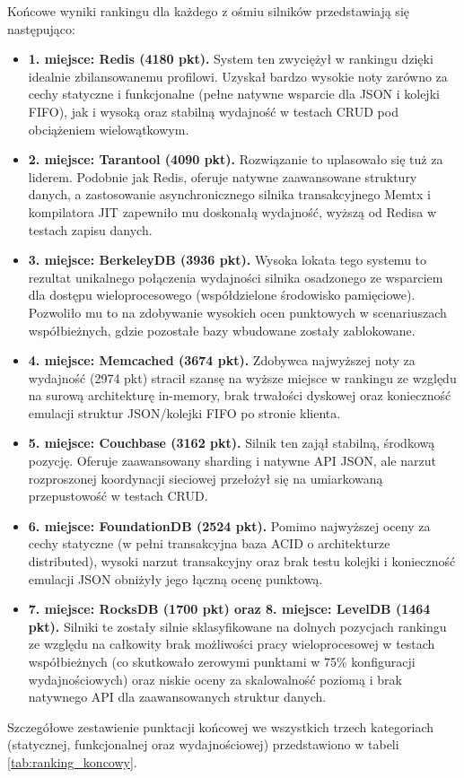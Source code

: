 Końcowe wyniki rankingu dla każdego z ośmiu silników przedstawiają się następująco:
\begin{itemize}
    \item \textbf{1. miejsce: Redis (4180 pkt).} System ten zwyciężył w rankingu dzięki idealnie zbilansowanemu profilowi. Uzyskał bardzo wysokie noty zarówno za cechy statyczne i funkcjonalne (pełne natywne wsparcie dla JSON i kolejki FIFO), jak i wysoką oraz stabilną wydajność w testach CRUD pod obciążeniem wielowątkowym.
    \item \textbf{2. miejsce: Tarantool (4090 pkt).} Rozwiązanie to uplasowało się tuż za liderem. Podobnie jak Redis, oferuje natywne zaawansowane struktury danych, a zastosowanie asynchronicznego silnika transakcyjnego Memtx i kompilatora JIT zapewniło mu doskonałą wydajność, wyższą od Redisa w testach zapisu danych.
    \item \textbf{3. miejsce: BerkeleyDB (3936 pkt).} Wysoka lokata tego systemu to rezultat unikalnego połączenia wydajności silnika osadzonego ze wsparciem dla dostępu wieloprocesowego (współdzielone środowisko pamięciowe). Pozwoliło mu to na zdobywanie wysokich ocen punktowych w scenariuszach współbieżnych, gdzie pozostałe bazy wbudowane zostały zablokowane.
    \item \textbf{4. miejsce: Memcached (3674 pkt).} Zdobywca najwyższej noty za wydajność (2974 pkt) stracił szansę na wyższe miejsce w rankingu ze względu na surową architekturę in-memory, brak trwałości dyskowej oraz konieczność emulacji struktur JSON/kolejki FIFO po stronie klienta.
    \item \textbf{5. miejsce: Couchbase (3162 pkt).} Silnik ten zajął stabilną, środkową pozycję. Oferuje zaawansowany sharding i natywne API JSON, ale narzut rozproszonej koordynacji sieciowej przełożył się na umiarkowaną przepustowość w testach CRUD.
    \item \textbf{6. miejsce: FoundationDB (2524 pkt).} Pomimo najwyższej oceny za cechy statyczne (w pełni transakcyjna baza ACID o architekturze distributed), wysoki narzut transakcyjny oraz brak testu kolejki i konieczność emulacji JSON obniżyły jego łączną ocenę punktową.
    \item \textbf{7. miejsce: RocksDB (1700 pkt) oraz 8. miejsce: LevelDB (1464 pkt).} Silniki te zostały silnie sklasyfikowane na dolnych pozycjach rankingu ze względu na całkowity brak możliwości pracy wieloprocesowej w testach współbieżnych (co skutkowało zerowymi punktami w 75\% konfiguracji wydajnościowych) oraz niskie oceny za skalowalność poziomą i brak natywnego API dla zaawansowanych struktur danych.
\end{itemize}

Szczegółowe zestawienie punktacji końcowej we wszystkich trzech kategoriach (statycznej, funkcjonalnej oraz wydajnościowej) przedstawiono w tabeli \ref{tab:ranking_koncowy}.


